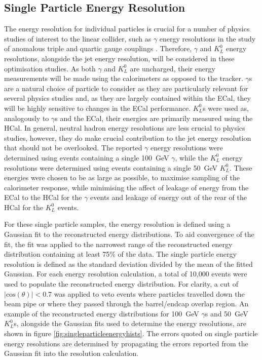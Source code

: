 \subsection{Single Particle Energy Resolution}
The energy resolution for individual particles is crucial for a number of physics studies of interest to the linear collider, such as $\gamma$ energy resolutions in the study of anomalous triple and quartic gauge couplings \cite{Chatrchyan:2013fya,ATLAS:2012mec,Chatrchyan:2014bza}.  Therefore, $\gamma$ and $K^{0}_{L}$ energy resolutions, alongside the jet energy resolution, will be considered in these optimisation studies.  As both $\gamma$ and $K^{0}_{L}$ are uncharged, their energy measurements will be made using the calorimeters as opposed to the tracker.  $\gamma$s are a natural choice of particle to consider as they are particularly relevant for several physics studies and, as they are largely contained within the ECal, they will be highly sensitive to changes in the ECal performance.  $K^{0}_{L}$s were used as, analogously to $\gamma$s and the ECal, their energies are primarily measured using the HCal.  In general, neutral hadron energy resolutions are less crucial to physics studies, however, they do make crucial contribution to the jet energy resolution that should not be overlooked.  The reported $\gamma$ energy resolutions were determined using events containing a single 100~GeV $\gamma$, while the $K^{0}_{L}$ energy resolutions were determined using events containing a single 50~GeV $K^{0}_{L}$.  These energies were chosen to be as large as possible, to maximise sampling of the calorimeter response, while minimising the affect of leakage of energy from the ECal to the HCal for the $\gamma$ events and leakage of energy out of the rear of the HCal for the $K^{0}_{L}$ events.

For these single particle samples, the energy resolution is defined using a Gaussian fit to the reconstructed energy distributions.  To aid convergence of the fit, the fit was applied to the narrowest range of the reconstructed energy distribution containing at least 75\% of the data.  The single particle energy resolution is defined as the standard deviation divided by the mean of the fitted Gaussian.  For each energy resolution calculation, a total of 10,000 events were used to populate the reconstructed energy distribution.  For clarity, a cut of $|\text{cos}(\theta)| < 0.7$ was applied to veto events where particles travelled down the beam pipe or where they passed through the barrel/endcap overlap region.  An example of the reconstructed energy distributions for 100~GeV $\gamma$s and 50~GeV $K^{0}_{L}$s, alongside the Gaussian fits used to determine the energy resolutions, are shown in figure \ref{fig:singleparticleenergyhists}.  The errors quoted on single particle energy resolutions are determined by propagating the errors reported from the Gaussian fit into the resolution calculation.  

